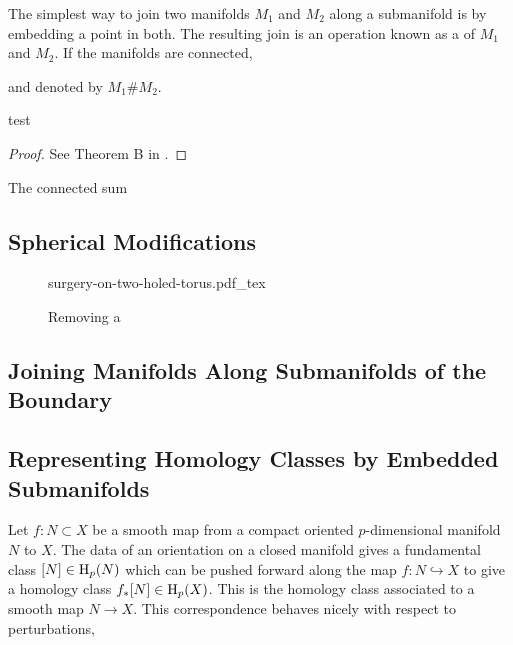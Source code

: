 The simplest way to join two manifolds $M_1$ and $M_2$ along a submanifold is by embedding a point in both. The resulting join is an operation known as a  of $M_1$ and $M_2$. If the manifolds are connected,

and denoted by $M_1\# M_2$.

\begin{theorem}
	test
\end{theorem}
\begin{proof}
	See Theorem B in \cite{palais1960diffeomorphism}.
\end{proof}

\begin{proposition}\label{prop:connected-sum-operation}
	The connected sum
\end{proposition}

\subsection{Spherical Modifications}

\begin{figure}[ht]
	{surgery-on-two-holed-torus.pdf_tex}
	\caption{Removing a }
\end{figure}

\subsection{Joining Manifolds Along Submanifolds of the Boundary}

\subsection{Representing Homology Classes by Embedded Submanifolds}\label{sec:representing-homology-classes}

Let $f : N\subset X$ be a smooth map from a compact oriented $p$-dimensional manifold $N$ to $X$. The data of an orientation on a closed manifold gives a fundamental class $[N]\in \operatorname{H}_p(N)$ which can be pushed forward along the map $f : N \hookrightarrow X$ to give a homology class $f_* [N]\in \operatorname{H}_p(X)$. This is the homology class associated to a smooth map $N\to X$.
This correspondence behaves nicely with respect to perturbations, 

